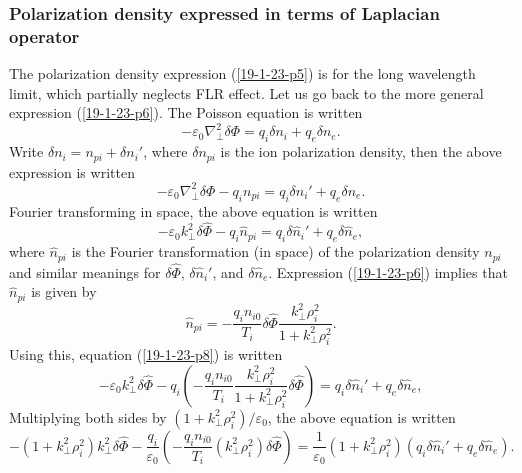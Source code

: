 \documentclass{llncs}
\begin{document}
\subsubsection{Polarization density expressed in terms of Laplacian operator}

The polarization density expression (\ref{19-1-23-p5}) is for the long
wavelength limit, which partially neglects FLR effect. Let us go back to the
more general expression (\ref{19-1-23-p6}). The Poisson equation is written
\begin{equation}
  - \varepsilon_0 \nabla_{\perp}^2 \delta \Phi = q_i \delta n_i + q_e \delta
  n_e .
\end{equation}
Write $\delta n_i = n_{p i} + \delta n_i'$, where $\delta n_{p i}$ is the ion
polarization density, then the above expression is written
\begin{equation}
  - \varepsilon_0 \nabla_{\perp}^2 \delta \Phi - q_i n_{p i} = q_i \delta n_i'
  + q_e \delta n_e .
\end{equation}
Fourier transforming in space, the above equation is written
\begin{equation}
  \label{19-1-23-p8} - \varepsilon_0 k_{\perp}^2 \delta \hat{\Phi} - q_i
  \hat{n}_{p i} = q_i \delta \hat{n}_i' + q_e \delta \hat{n}_e,
\end{equation}
where $\hat{n}_{p i}$ is the Fourier transformation (in space) of the
polarization density $n_{p i}$ and similar meanings for $\delta \hat{\Phi}$,
$\delta \hat{n}_i'$, and $\delta \hat{n}_e$. Expression (\ref{19-1-23-p6})
implies that $\hat{n}_{p i}$ is given by
\begin{equation}
  \hat{n}_{p i} = - \frac{q_i n_{i 0}}{T_i} \delta \hat{\Phi}
  \frac{k_{\perp}^2 \rho^2_i}{1 + k_{\perp}^2 \rho^2_i} .
\end{equation}
Using this, equation (\ref{19-1-23-p8}) is written
\begin{equation}
  - \varepsilon_0 k_{\perp}^2 \delta \hat{\Phi} - q_i \left( - \frac{q_i n_{i
  0}}{T_i} \frac{k_{\perp}^2 \rho^2_i}{1 + k_{\perp}^2 \rho^2_i} \delta
  \hat{\Phi} \right) = q_i \delta \hat{n}_i' + q_e \delta \hat{n}_e,
\end{equation}
Multiplying both sides by $(1 + k_{\perp}^2 \rho_i^2) / \varepsilon_0$, the
above equation is written
\begin{equation}
  - (1 + k_{\perp}^2 \rho^2_i) k_{\perp}^2 \delta \hat{\Phi} -
  \frac{q_i}{\varepsilon_0} \left( - \frac{q_i n_{i 0}}{T_i} (k_{\perp}^2
  \rho^2_i) \delta \hat{\Phi} \right) = \frac{1}{\varepsilon_0} (1 +
  k_{\perp}^2 \rho^2_i) (q_i \delta \hat{n}_i' + q_e \delta \hat{n}_e) .
\end{equation}
\end{document}
